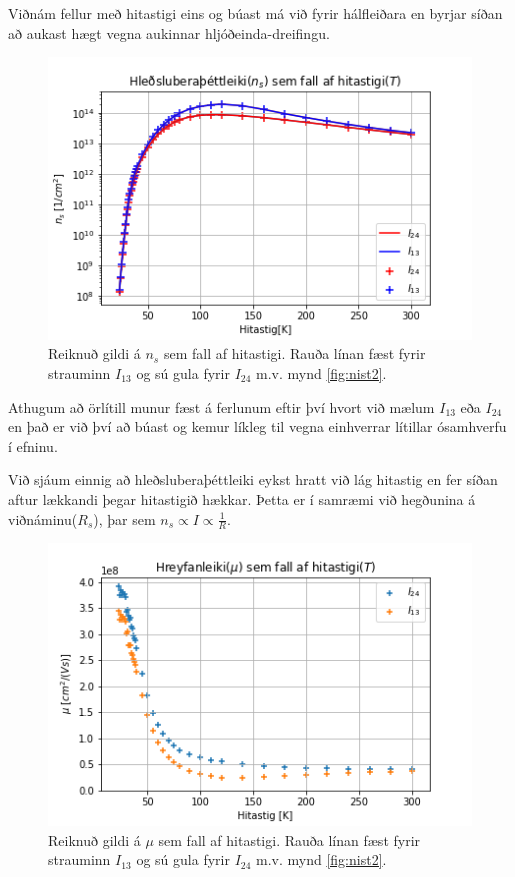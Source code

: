 \documentclass[11pt]{article}
\begin{document}
Viðnám fellur með hitastigi eins og búast má við fyrir hálfleiðara en byrjar síðan að aukast hægt vegna aukinnar hljóðeinda-dreifingu.

\begin{figure}[H]
    \centering
    \includegraphics{n_s.PNG}
    \caption{Reiknuð gildi á $n_s$ sem fall af hitastigi. Rauða línan fæst fyrir strauminn $I_{13}$ og sú gula fyrir $I_{24}$ m.v. mynd \ref{fig:nist2}.}
    \label{fig:n_s}
\end{figure}
Athugum að örlítill munur fæst á ferlunum eftir því hvort við mælum $I_{13}$ eða $I_{24}$ en það er við því að búast og kemur líkleg til vegna einhverrar lítillar ósamhverfu í efninu. 

Við sjáum einnig að hleðsluberaþéttleiki eykst hratt við lág hitastig en fer síðan aftur lækkandi þegar hitastigið hækkar. Þetta er í samræmi við hegðunina á viðnáminu($R_s$), þar sem $n_s\propto I \propto \frac{1}{R}$.


\begin{figure}[H]
    \centering
    \includegraphics{mu.PNG}
    \caption{Reiknuð gildi á $\mu$ sem fall af hitastigi. Rauða línan fæst fyrir strauminn $I_{13}$ og sú gula fyrir $I_{24}$ m.v. mynd \ref{fig:nist2}.}
    \label{fig:mu}
\end{figure}
\end{document}
